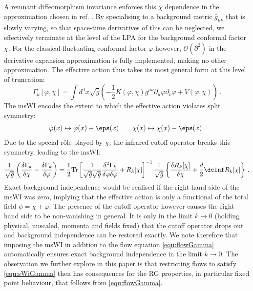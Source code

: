 \documentclass[11pt]{book} %
\newcommand{\be}{\begin{equation}}
\newcommand{\ee}{\end{equation}}
\newcommand{\vp}{\varphi}
\begin{document}
A remnant diffeomorphism invariance enforces this $\chi$ dependence in the approximation chosen in ref. \cite{Dietz:2015owa}.
By specialising to a background metric ${\bar g}_{\mu\nu}$ that is slowly varying, so that space-time derivatives of this can be neglected, we
effectively terminate at the level of the LPA for the background conformal factor $\chi$. For the classical fluctuating conformal factor $\vp$ however,  $\mathcal{O}(\partial^2)$ in the derivative expansion approximation is fully implemented, making no other approximation.
The effective action thus takes its most general form at this level of truncation:
\begin{equation}
\label{trunc}
	\Gamma_k[\varphi, \chi] = \int d^dx \sqrt{\bar g} \left( -\frac{1}{2}K(\varphi,\chi)
	\bar g^{\mu\nu}\partial_{\mu}\varphi\partial_{\nu}\varphi + V(\varphi,\chi)  \right)\,.
\end{equation}
The msWI encodes the extent to which the effective action violates split symmetry:
\be
\label{equ:split-symmetry}
\tilde \vp(x) \mapsto \tilde \vp(x) + \eps(x) \qquad \chi(x) \mapsto \chi(x) -\eps(x)\,.
\ee
Due to the special r\^ole played by $\chi$, the infrared cutoff operator breaks this symmetry, leading to the msWI:
\be
\label{equ:sWiGamma}
\frac{1}{\sqrt{\bar g}}\left(\frac{\delta\Gamma_k}{\delta \chi}-\frac{\delta \Gamma_k}{\delta \vp}\right)
      =\frac{1}{2}\mathrm{Tr}\left[\frac{1}{\sqrt{\bar g}\sqrt{\bar g}}\frac{\delta^2\Gamma_k}
				  {\delta \vp \delta \vp}+ R_k[\chi]\right]^{-1} \frac{1}{\sqrt{\bar g}}
				  \left\{\frac{\delta R_k[\chi] }{\delta \chi}+\frac{d}{2}\dclnf R_k[\chi]\right\}\,.
\ee
Exact background independence would be realised if the right hand side of the msWI was zero, implying that the effective action is only a functional of the total field $\phi = \chi + \vp$. The presence of the cutoff operator however causes the right hand side to be non-vanishing in general. It is only in the limit $k\rightarrow0$ (holding physical, \ie unscaled, momenta and fields fixed) that the cutoff operator drops out and background independence can be restored exactly. We note therefore that imposing the msWI in addition to the flow equation \eqref{equ:flowGamma} automatically ensures exact background independence in the limit $k\rightarrow0$. The observation we further explore in this paper is that restricting flows to satisfy \eqref{equ:sWiGamma} then has consequences for the RG properties, in particular fixed point behaviour, that follows from \eqref{equ:flowGamma}.
\end{document}
